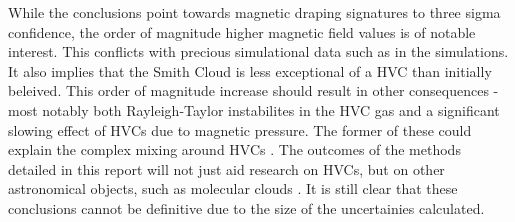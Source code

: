 While the conclusions point towards magnetic draping signatures to three sigma confidence, the order of magnitude higher magnetic field values is of notable interest. This conflicts with precious simulational data such as in the \citeauthor{ID23} simulations. It also implies that the Smith Cloud is less exceptional of a HVC than initially beleived. This order of magnitude increase should result in other consequences - most notably both Rayleigh-Taylor instabilites in the HVC gas and a significant slowing effect of HVCs due to magnetic pressure. The former of these could explain the complex mixing around HVCs \citep{ID67}. The outcomes of the methods detailed in this report will not just aid research on HVCs, but on other astronomical objects, such as molecular clouds \citep{ID70}. It is still clear that these conclusions cannot be definitive due to the size of the uncertainies calculated.
